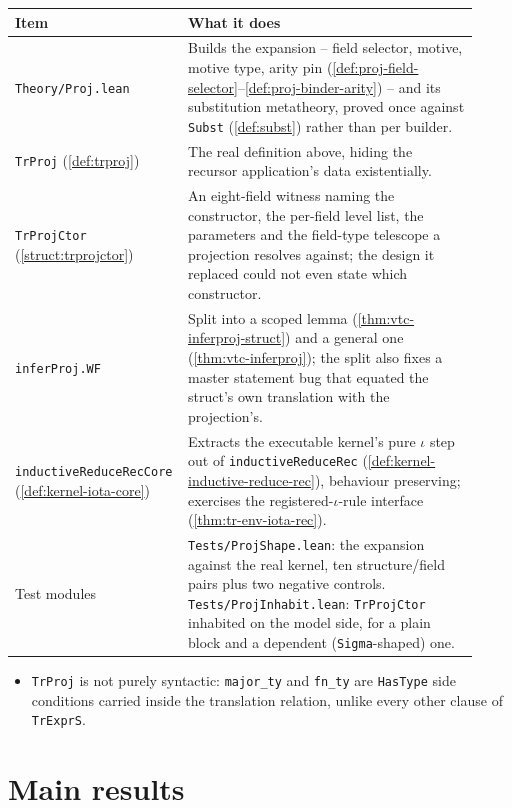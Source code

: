 \par\smallskip\noindent
\begin{tabular}{p{0.30\linewidth}p{0.62\linewidth}}
\toprule
Item & What it does \\
\midrule
\texttt{Theory/Proj.lean} & Builds the expansion -- field selector, motive, motive type, arity pin
(\ref{def:proj-field-selector}--\ref{def:proj-binder-arity}) -- and its substitution metatheory,
proved once against \texttt{Subst} (\ref{def:subst}) rather than per builder. \\
\texttt{TrProj} (\ref{def:trproj}) & The real definition above, hiding the recursor application's
data existentially. \\
\texttt{TrProjCtor} (\ref{struct:trprojctor}) & An eight-field witness naming the constructor, the
per-field level list, the parameters and the field-type telescope a projection resolves against;
the design it replaced could not even state which constructor. \\
\texttt{inferProj.WF} & Split into a scoped lemma (\ref{thm:vtc-inferproj-struct}) and a general one
(\ref{thm:vtc-inferproj}); the split also fixes a master statement bug that equated the struct's
own translation with the projection's. \\
\texttt{inductiveReduceRecCore} (\ref{def:kernel-iota-core}) & Extracts the executable kernel's
pure $\iota$ step out of \texttt{inductiveReduceRec} (\ref{def:kernel-inductive-reduce-rec}),
behaviour preserving; exercises the registered-$\iota$-rule interface (\ref{thm:tr-env-iota-rec}). \\
Test modules & \texttt{Tests/ProjShape.lean}: the expansion against the real kernel, ten
structure/field pairs plus two negative controls. \texttt{Tests/ProjInhabit.lean}:
\texttt{TrProjCtor} inhabited on the model side, for a plain block and a dependent
(\texttt{Sigma}-shaped) one. \\
\bottomrule
\end{tabular}\par\smallskip

\begin{itemize}
\item {} \texttt{TrProj} is not purely syntactic: \texttt{major\_ty} and
\texttt{fn\_ty} are \texttt{HasType} side conditions carried inside the translation relation,
unlike every other clause of \texttt{TrExprS}.
\end{itemize}

\section{Main results}

